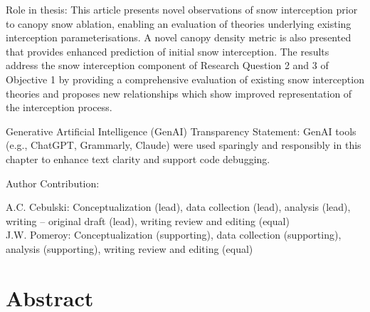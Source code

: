 \documentclass[
  letterpaper,
]{tex/uofsthesis-cs}
\begin{document}
Role in thesis: This article presents novel observations of snow
interception prior to canopy snow ablation, enabling an evaluation of
theories underlying existing interception parameterisations. A novel
canopy density metric is also presented that provides enhanced
prediction of initial snow interception. The results address the snow
interception component of Research Question 2 and 3 of Objective 1 by
providing a comprehensive evaluation of existing snow interception
theories and proposes new relationships which show improved
representation of the interception process.

Generative Artificial Intelligence (GenAI) Transparency Statement: GenAI
tools (e.g., ChatGPT, Grammarly, Claude) were used sparingly and
responsibly in this chapter to enhance text clarity and support code
debugging.

Author Contribution:

A.C. Cebulski: Conceptualization (lead), data collection (lead),
analysis (lead), writing -- original draft (lead), writing review and
editing (equal)\\
J.W. Pomeroy: Conceptualization (supporting), data collection
(supporting), analysis (supporting), writing review and editing (equal)

\section{Abstract}\label{abstract-1}
\end{document}
